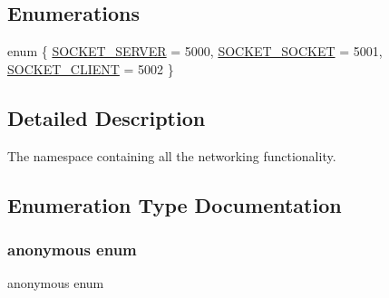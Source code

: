 \subsection*{Enumerations}
\begin{DoxyCompactItemize}
\item 
enum \{ \mbox{\hyperlink{namespace_rad_j_a_v_1_1_networking_a9835cabf529b549093bd0c7048bada48a84a07e932f5c2b0454a13e10f15e4103}{S\+O\+C\+K\+E\+T\+\_\+\+S\+E\+R\+V\+ER}} = 5000, 
\mbox{\hyperlink{namespace_rad_j_a_v_1_1_networking_a9835cabf529b549093bd0c7048bada48a35e69c9623c550c84a5b2ba52ea3af2d}{S\+O\+C\+K\+E\+T\+\_\+\+S\+O\+C\+K\+ET}} = 5001, 
\mbox{\hyperlink{namespace_rad_j_a_v_1_1_networking_a9835cabf529b549093bd0c7048bada48a11c51975fabad7dd57dc8c5aee4d95c1}{S\+O\+C\+K\+E\+T\+\_\+\+C\+L\+I\+E\+NT}} = 5002
 \}
\end{DoxyCompactItemize}


\subsection{Detailed Description}
The namespace containing all the networking functionality. 

\subsection{Enumeration Type Documentation}
\mbox{\label{namespace_rad_j_a_v_1_1_networking_a9835cabf529b549093bd0c7048bada48}} 
\subsubsection{\texorpdfstring{anonymous enum}{anonymous enum}}
{\footnotesize\ttfamily anonymous enum}


